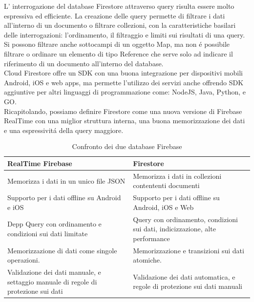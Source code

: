 L' interrogazione del database Firestore attraverso query risulta essere molto espressiva ed efficiente. La creazione delle query permette di filtrare i dati all'interno di un documento o filtrare collezioni, con la caratteristiche basilari delle interrogazioni: l'ordinamento, il filtraggio e limiti sui risultati di una query. Si possono filtrare anche sottocampi di un oggetto Map, ma non \'e possibile filtrare o ordinare un elemento di tipo Reference che serve solo ad indicare il riferimento di un documento all'interno del database.\\
Cloud Firestore offre un SDK con una buona integrazione per dispositivi mobili Android, iOS e web apps, ma permette l'utilizzo dei servizi anche offrendo SDK aggiuntive per altri linguaggi di programmazione come: NodeJS, Java, Python, e GO.\\


Ricapitolando, possiamo definire Firestore come una nuova versione di Firebase RealTime con una miglior struttura interna, una buona memorizzazione dei dati e una espressivit\'a della query maggiore.

\begin{table}[h]
\begin{center}
\begin{tabular}{|p{7.5cm}|p{7cm}|}
    \hline
    \textbf{RealTime Firebase} & \textbf{Firestore} \\ \hline
    Memorizza i dati in un unico file JSON & Memorizza i dati in collezioni contententi documenti \\ \hline
    Supporto per i dati offline su Android e iOS & Supporto per i dati offline su Android, iOS e Web \\ \hline
    Depp Query con ordinamento e condizioni sui dati limitate & Query con ordinamento, condizioni sui dati, indicizzazione, alte performance \\ \hline
    Memorizzazione di dati come singole operazioni. & Memorizzazione e transizioni sui dati atomiche.\\ \hline
    Validazione dei dati manuale, e settaggio manuale di regole di protezione sui dati &  Validazione dei dati automatica, e regole di protezione sui dati manuali\\
\hline
\end{tabular}
\caption[Firebase vs Firestore ]{Confronto dei due database Firebase}\label{tab:FirestorevSFirebase}
\end{center}
\end{table}


